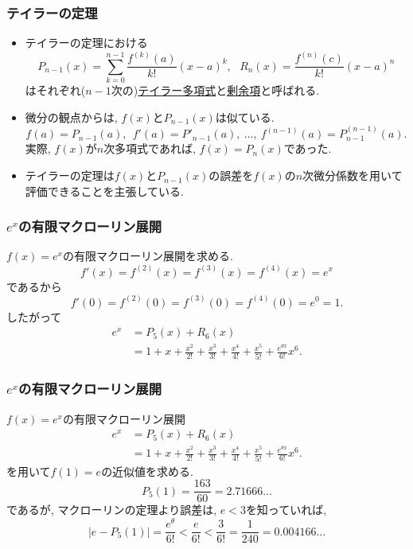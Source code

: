 \begin{frame}
\frametitle{テイラーの定理}


\begin{itemize}
\item テイラーの定理における
$$
P_{n-1}(x)=\sum_{k=0}^{n-1}\frac{f^{(k)}(a)}{k!}(x-a)^k, \ \ \ 
R_n(x)=\frac{f^{(n)}(c)}{k!}(x-a)^n
$$
はそれぞれ($n-1$次の)\underline{テイラー多項式}と\underline{剰余項}と呼ばれる. 
\item 微分の観点からは, $f(x)$と$P_{n-1}(x)$は似ている. 
$$
f(a)=P_{n-1}(a), \ \ f '(a)=P'_{n-1}(a), \ \dots, \  f^{(n-1)}(a)=P^{(n-1)}_{n-1}(a). 
$$
実際, $f(x)$が$n$次多項式であれば, $f(x)=P_n(x)$であった. 
\item テイラーの定理は$f(x)$と$P_{n-1}(x)$の誤差を$f(x)$の$n$次微分係数を用いて評価できることを主張している. 
\end{itemize}

\end{frame}






\begin{frame}
\frametitle{$e^x$の有限マクローリン展開}

$f(x)=e^x$の有限マクローリン展開を求める. 
$$
f'(x)=f^{(2)}(x)=f^{(3)}(x)=f^{(4)}(x)=e^x
$$
であるから
$$
f'(0)=f^{(2)}(0)=f^{(3)}(0)=f^{(4)}(0)=e^0=1. 
$$
したがって
\begin{align*}
e^x &= P_5(x)+R_6(x) \\
& = 1+x+\frac{x^2}{2!}+\frac{x^3}{3!}+\frac{x^4}{4!}+\frac{x^5}{5!}+\frac{e^{\theta x}}{6!}x^6. 
\end{align*}

\end{frame}






\begin{frame}
\frametitle{$e^x$の有限マクローリン展開}

$f(x)=e^x$の有限マクローリン展開
\begin{align*}
e^x &= P_5(x)+R_6(x) \\
& = 1+x+\frac{x^2}{2!}+\frac{x^3}{3!}+\frac{x^4}{4!}+\frac{x^5}{5!}+\frac{e^{\theta x}}{6!}x^6. 
\end{align*}
を用いて$f(1)=e$の近似値を求める. 
$$
P_5(1)=\frac{163}{60}=2.71666\dots
$$
であるが, マクローリンの定理より誤差は, $e<3$を知っていれば, 
$$
|e-P_5(1)|=\frac{e^\theta}{6!}<\frac{e}{6!}<\frac{3}{6!}=\frac{1}{240}=0.004166\dots
$$

\end{frame}



